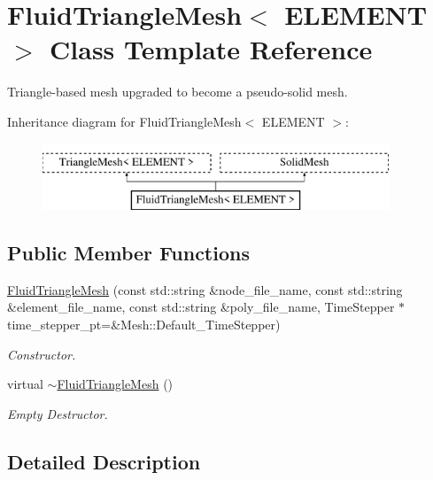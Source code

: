 \hypertarget{classFluidTriangleMesh}{}\section{Fluid\+Triangle\+Mesh$<$ E\+L\+E\+M\+E\+NT $>$ Class Template Reference}
\label{classFluidTriangleMesh}


Triangle-\/based mesh upgraded to become a pseudo-\/solid mesh.  


Inheritance diagram for Fluid\+Triangle\+Mesh$<$ E\+L\+E\+M\+E\+NT $>$\+:\begin{figure}[H]
\begin{center}
\leavevmode
\includegraphics[height=2.000000cm]{classFluidTriangleMesh}
\end{center}
\end{figure}
\subsection*{Public Member Functions}
\begin{DoxyCompactItemize}
\item 
\hyperlink{classFluidTriangleMesh_ab86c8fd8ee699923f5a4b199981d8c76}{Fluid\+Triangle\+Mesh} (const std\+::string \&node\+\_\+file\+\_\+name, const std\+::string \&element\+\_\+file\+\_\+name, const std\+::string \&poly\+\_\+file\+\_\+name, Time\+Stepper $\ast$time\+\_\+stepper\+\_\+pt=\&Mesh\+::\+Default\+\_\+\+Time\+Stepper)
\begin{DoxyCompactList}\small\item\em Constructor. \end{DoxyCompactList}\item 
virtual \hyperlink{classFluidTriangleMesh_adc38a903db4d9438e3cce8608f89be83}{$\sim$\+Fluid\+Triangle\+Mesh} ()
\begin{DoxyCompactList}\small\item\em Empty Destructor. \end{DoxyCompactList}\end{DoxyCompactItemize}


\subsection{Detailed Description}
